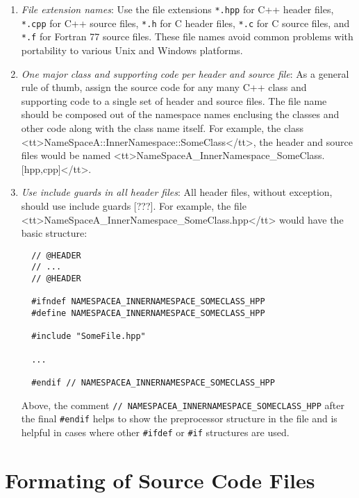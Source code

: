 \begin{enumerate}

{}\item\textit{File extension names}: Use the file extensions {}\texttt{*.hpp}
for C++ header files, {}\texttt{*.cpp} for C++ source files, {}\texttt{*.h}
for C header files, {}\texttt{*.c} for C source files, and {}\texttt{*.f} for
Fortran 77 source files.  These file names avoid common problems with
portability to various Unix and Windows platforms.

{}\item\textit{One major class and supporting code per header and source
file}: As a general rule of thumb, assign the source code for any many C++
class and supporting code to a single set of header and source files.  The
file name should be composed out of the namespace names enclusing the classes
and other code along with the class name itself.  For example, the class
<tt>NameSpaceA\-::InnerNamespace\-::SomeClass</tt>, the header and source
files would be named
<tt>NameSpaceA\-\_InnerNamespace\-\_SomeClass.[hpp,cpp]</tt>.

{}\item\textit{Use include guards in all header files}: All header files,
without exception, should use include guards [???].  For example, the file
<tt>NameSpaceA\-\_InnerNamespace\-\_SomeClass.hpp</tt> would have the basic
structure:

\begin{verbatim}
  // @HEADER
  // ...
  // @HEADER

  #ifndef NAMESPACEA_INNERNAMESPACE_SOMECLASS_HPP
  #define NAMESPACEA_INNERNAMESPACE_SOMECLASS_HPP

  #include "SomeFile.hpp"

  ...

  #endif // NAMESPACEA_INNERNAMESPACE_SOMECLASS_HPP
\end{verbatim}

Above, the comment {}\texttt{//
NAMESPACEA\-\_INNERNAMESPACE\-\_SOMECLASS\-\_HPP} after the final
{}\texttt{\#endif} helps to show the preprocessor structure in the file and is
helpful in cases where other {}\texttt{\#ifdef} or {}\texttt{\#if} structures
are used.

\end{enumerate}

%
\section{Formating of Source Code Files}
%

